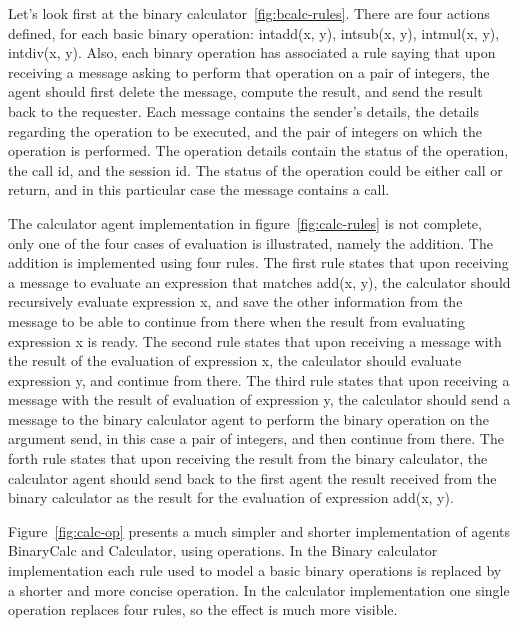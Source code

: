 \documentclass[a4paper,12pt,oneside,fleqn]{book} %
\begin{document}
Let's look first at the binary calculator~\ref{fig:bcalc-rules}. There are
four actions defined, for each basic binary operation: intadd(x, y),
intsub(x, y), intmul(x, y), intdiv(x, y). Also, each binary operation has
associated a rule saying that upon receiving a message asking to perform
that operation on a pair of integers, the agent should first delete the
message, compute the result, and send the result back to the requester.
Each message contains the sender's details, the details regarding the
operation to be executed, and the pair of integers on which the operation
is performed. The operation details contain the status of the operation,
the call id, and the session id. The status of the operation could be
either call or return, and in this particular case the message contains a
call.

The calculator agent implementation in figure~\ref{fig:calc-rules} is not
complete, only one of the four cases of evaluation is illustrated, namely
the addition. The addition is implemented using four rules. The first rule
states that upon receiving a message to evaluate an expression that matches
add(x, y), the calculator should recursively evaluate expression x, and save
the other information from the message to be able to continue from there when
the result from evaluating expression x is ready. The second rule states
that upon receiving a message with the result of the evaluation of
expression x, the calculator should evaluate expression y, and continue
from there. The third rule states that upon receiving a message with the
result of evaluation of expression y, the calculator should send a message
to the binary calculator agent to perform the binary operation on the
argument send, in this case a pair of integers, and then continue from
there. The forth rule states that upon receiving the result from the
binary calculator, the calculator agent should send back to the first agent
the result received from the binary calculator as the result for the
evaluation of expression add(x, y).

Figure~\ref{fig:calc-op} presents a much simpler and shorter implementation
of agents BinaryCalc and Calculator, using operations. In the Binary
calculator implementation each rule used to model a basic binary operations
is replaced by a shorter and more concise operation. In the calculator
implementation one single operation replaces four rules, so the effect is
much more visible.
\end{document}
